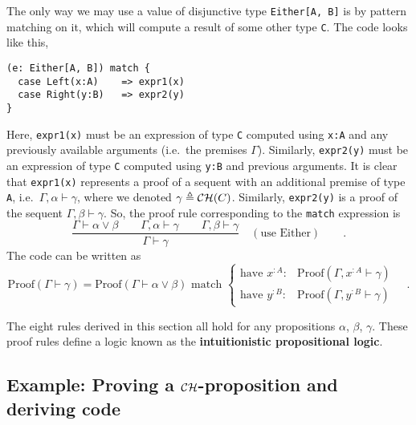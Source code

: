 The only way we may use a value of disjunctive type \lstinline!Either[A, B]!
is by pattern matching on it, which will compute a result of some
other type \lstinline!C!.
The code looks like this,
\begin{lstlisting}
(e: Either[A, B]) match {
  case Left(x:A)    => expr1(x)
  case Right(y:B)   => expr2(y)
}
\end{lstlisting}
Here, \lstinline!expr1(x)!
must be an expression of type \lstinline!C!
computed using \lstinline!x:A!
and any previously available arguments (i.e.~the premises $\Gamma$).
Similarly, \lstinline!expr2(y)!
must be an expression of type \lstinline!C!
computed using \lstinline!y:B!
and previous arguments. It is clear that \lstinline!expr1(x)!
represents a proof of a sequent with an additional premise of type
\lstinline!A!, i.e.~$\Gamma,\alpha\vdash\gamma$,
where we denoted $\gamma\triangleq{\cal CH}(C)$. Similarly, \lstinline!expr2(y)!
is a proof of the sequent $\Gamma,\beta\vdash\gamma$. So, the proof
rule corresponding to the \lstinline!match!
expression is
\[
\frac{\Gamma\vdash\alpha\vee\beta\quad\quad\Gamma,\alpha\vdash\gamma\quad\quad\Gamma,\beta\vdash\gamma}{\Gamma\vdash\gamma}\quad(\text{use Either})\quad\quad.
\]
The code can be written as 
\[
\text{Proof}\left(\Gamma\vdash\gamma\right)=\text{Proof}\left(\Gamma\vdash\alpha\vee\beta\right)\text{ match }\begin{cases}
\text{have }x^{:A}: & \text{Proof}\left(\Gamma,x^{:A}\vdash\gamma\right)\\
\text{have }y^{:B}: & \text{Proof}(\Gamma,y^{:B}\vdash\gamma)
\end{cases}\quad.
\]

The eight rules derived in this section all hold for any propositions
$\alpha$, $\beta$, $\gamma$. These proof rules define a logic known
as the \textbf{intuitionistic
propositional logic}.

\subsection{Example: Proving a ${\cal CH}$-proposition and deriving code\label{subsec:Example:-Proving-a-ch-proposition}}

